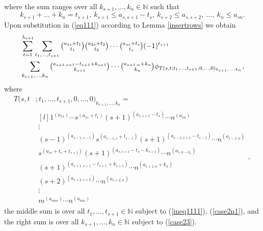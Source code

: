 \documentclass[ALCO,Unicode]{cedram}
\numberwithin{equation}{section}
\begin{document}
	where the sum ranges over all
	$k_{s+1},\dots,k_n \in \mathbb{N}$ such that \begin{equation}\label{case23}k_{s+1}+\dots+k_n=t_{s+1}, \  k_{s+1} \le a_{s,s+1}-t_s, \  k_{s+2} \le a_{s,s+2}, \  \dots, \  k_n \le a_{sn}.\end{equation}
	Upon substitution in (\ref{eq111}) according to Lemma \ref{insertrows} we obtain
	\begin{align*}
		&\sum_{t=1}^{\lambda_{s+1}}\sum_{t_1,\dots,t_{s+1}}\tbinom{a_{1s}+t_1}{t_1}\tbinom{a_{2s}+t_2}{t_2} \cdots \tbinom{a_{ss}+t_s}{t_s}(-1)^{t_{s+1}}\\& \sum_{k_{s+1},\dots,k_n}\tbinom{a_{s+1,s+1}-t_{s+1}+k_{s+1}}{k_{s+1}}\cdots\tbinom{a_{s+1,n}+k_n}{k_n}\phi_{T(s,t;t_1,\dots,t_{s+1},0,\dots,0)_{k_{s+1},\dots,k_n}},
	\end{align*} 
	where  \begin{align}\label{eq1110}T(s,t&;t_1,\dots,t_{s+1},0,\dots,0)_{k_{s+1},\dots,k_n}= \\\nonumber&\begin{matrix*}[l]
			1^{(a_{11})} \cdots s^{(a_{1s}+t_{1})}(s+1)^{(a_{1,s+1}-t_1)} \cdots n^{(a_{1n})} \\
			\vdots \\ 
			(s-1)^{(a_{s-1,s-1})}s^{(a_{s-1,s}+t_{s-1})}(s+1)^{(a_{s-1,s+1}-t_{s-1})} \cdots n^{(a_{s-1,n})} \\
			s^{(a_{ss}+t_s+t_{s+1})}(s+1)^{(a_{s,s+1}-t_s-k_{s+1})} \cdots n^{(a_{s,n-k_n})} \\
		(s+1)^{(a_{s+1,s+1}-t_{s+1}+k_{s+1})} \cdots n^{(a_{s+1,n}+k_n)}\\
			(s+2)^{(a_{s+2,s+2})}\cdots n^{(a_{s+2,n})} \\
			\vdots\\
			m^{(a_{mm})} \cdots n^{(a_{mn})}  \end{matrix*},\end{align} the middle sum is over all  $t_1,\dots,t_{s+1} \in \mathbb{N}$ subject to (\ref{ineq1111}), (\ref{case2n1}), and the right sum is over all  $k_{s+1},\dots,k_{n} \in \mathbb{N}$ subject to (\ref{case23}). 
	
\end{document}
